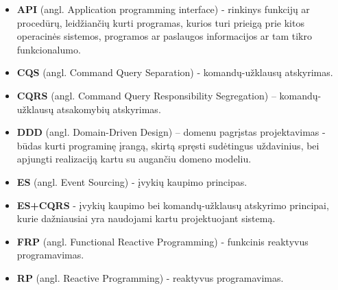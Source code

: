 \begin{itemize}

  \item \textbf{API} (angl. Application programming interface) - rinkinys funkcijų ar procedūrų, leidžiančių kurti programas, kurios turi prieigą prie kitos operacinės sistemos, programos ar paslaugos informacijos ar tam tikro funkcionalumo.

  \item \textbf{CQS} (angl. Command Query Separation) - komandų-užklausų atskyrimas.

  \item \textbf{CQRS} (angl. Command Query Responsibility Segregation) – komandų-užklausų atsakomybių atskyrimas.

  \item \textbf{DDD} (angl. Domain-Driven Design) – domenu pagrįstas projektavimas - būdas kurti programinę įrangą, skirtą spręsti sudėtingus uždavinius, bei apjungti realizaciją kartu su augančiu domeno modeliu.

  \item \textbf{ES} (angl. Event Sourcing) - įvykių kaupimo principas.

  \item \textbf{ES+CQRS} - įvykių kaupimo bei komandų-užklausų atskyrimo principai, kurie dažniausiai yra naudojami kartu projektuojant sistemą.

  \item \textbf{FRP} (angl. Functional Reactive Programming) - funkcinis reaktyvus programavimas.

  \item \textbf{RP} (angl. Reactive Programming) - reaktyvus programavimas.

\end{itemize}
